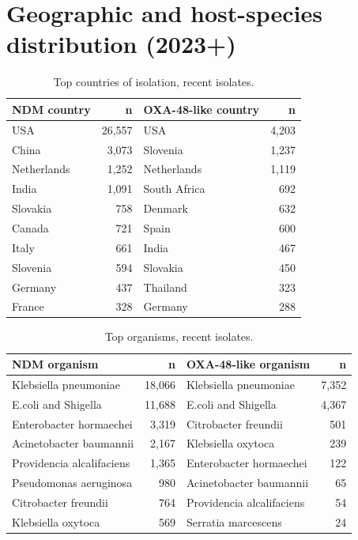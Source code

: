 \section{Geographic and host-species distribution (2023+)}
\begin{table}[h]\centering\small\caption{Top countries of isolation, recent isolates.}\begin{tabular}{lrlr}\hline
\textbf{NDM country}&\textbf{n}&\textbf{OXA-48-like country}&\textbf{n}\\\hline
USA&26,557&USA&4,203\\
China&3,073&Slovenia&1,237\\
Netherlands&1,252&Netherlands&1,119\\
India&1,091&South Africa&692\\
Slovakia&758&Denmark&632\\
Canada&721&Spain&600\\
Italy&661&India&467\\
Slovenia&594&Slovakia&450\\
Germany&437&Thailand&323\\
France&328&Germany&288\\
\hline\end{tabular}\end{table}
\begin{table}[h]\centering\small\caption{Top organisms, recent isolates.}\begin{tabular}{lrlr}\hline
\textbf{NDM organism}&\textbf{n}&\textbf{OXA-48-like organism}&\textbf{n}\\\hline
Klebsiella pneumoniae&18,066&Klebsiella pneumoniae&7,352\\
E.coli and Shigella&11,688&E.coli and Shigella&4,367\\
Enterobacter hormaechei&3,319&Citrobacter freundii&501\\
Acinetobacter baumannii&2,167&Klebsiella oxytoca&239\\
Providencia alcalifaciens&1,365&Enterobacter hormaechei&122\\
Pseudomonas aeruginosa&980&Acinetobacter baumannii&65\\
Citrobacter freundii&764&Providencia alcalifaciens&54\\
Klebsiella oxytoca&569&Serratia marcescens&24\\
\hline\end{tabular}\end{table}
